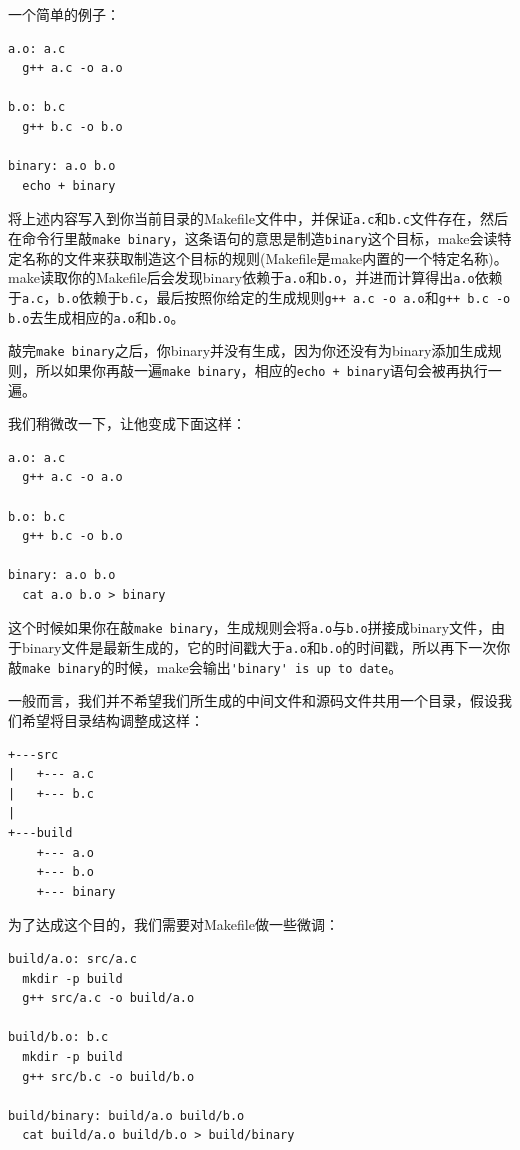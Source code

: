 \documentclass[lang=cn,11pt,a4paper]{elegantpaper}
\begin{document}
一个简单的例子：
\begin{lstlisting}
a.o: a.c
  g++ a.c -o a.o

b.o: b.c
  g++ b.c -o b.o

binary: a.o b.o
  echo + binary
\end{lstlisting}

将上述内容写入到你当前目录的Makefile文件中，并保证\lstinline!a.c!和\lstinline!b.c!文件存在，然后在命令行里敲\lstinline!make binary!，这条语句的意思是制造\lstinline!binary!这个目标，make会读特定名称的文件来获取制造这个目标的规则(Makefile是make内置的一个特定名称)。make读取你的Makefile后会发现binary依赖于\lstinline!a.o!和\lstinline!b.o!，并进而计算得出\lstinline!a.o!依赖于\lstinline!a.c!，\lstinline!b.o!依赖于\lstinline!b.c!，最后按照你给定的生成规则\lstinline!g++ a.c -o a.o!和\lstinline!g++ b.c -o b.o!去生成相应的\lstinline!a.o!和\lstinline!b.o!。

敲完\lstinline!make binary!之后，你binary并没有生成，因为你还没有为binary添加生成规则，所以如果你再敲一遍\lstinline!make binary!，相应的\lstinline!echo + binary!语句会被再执行一遍。

我们稍微改一下，让他变成下面这样：
\begin{lstlisting}
a.o: a.c
  g++ a.c -o a.o

b.o: b.c
  g++ b.c -o b.o

binary: a.o b.o
  cat a.o b.o > binary
\end{lstlisting}

这个时候如果你在敲\lstinline!make binary!，生成规则会将\lstinline!a.o!与\lstinline!b.o!拼接成binary文件，由于binary文件是最新生成的，它的时间戳大于\lstinline!a.o!和\lstinline!b.o!的时间戳，所以再下一次你敲\lstinline!make binary!的时候，make会输出\lstinline!'binary' is up to date!。

一般而言，我们并不希望我们所生成的中间文件和源码文件共用一个目录，假设我们希望将目录结构调整成这样：
\begin{lstlisting}
+---src
|   +--- a.c
|   +--- b.c
|
+---build
    +--- a.o
    +--- b.o
    +--- binary
\end{lstlisting}

为了达成这个目的，我们需要对Makefile做一些微调：
\begin{lstlisting}
build/a.o: src/a.c
  mkdir -p build
  g++ src/a.c -o build/a.o

build/b.o: b.c
  mkdir -p build
  g++ src/b.c -o build/b.o

build/binary: build/a.o build/b.o
  cat build/a.o build/b.o > build/binary
\end{lstlisting}
\end{document}
